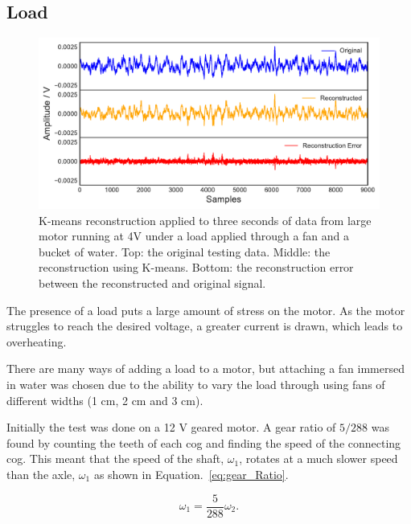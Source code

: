

\subsection{Load}

\begin{figure}[t]
    \includegraphics[width=1.0\textwidth]{fig/kmeans_large_4Vwater.pdf}
    \caption[K-means Large Motor Reconstruction In Water]{K-means reconstruction applied to three seconds of data from large motor running at 4V under a load applied through a fan and a bucket of water. Top: the original testing data. Middle: the reconstruction using K-means. Bottom: the reconstruction error between the reconstructed and original signal.}
    \label{fig:kmeans_large4Vwater}
\end{figure}

The presence of a load puts a large amount of stress on the motor. As the motor struggles to reach the desired voltage, a greater current is drawn, which leads to overheating.
        
There are many ways of adding a load to a motor, but attaching a fan immersed in water was chosen due to the ability to vary the load through using fans of different widths (1 cm, 2 cm and 3 cm).
    
Initially the test was done on a 12 V geared motor. A gear ratio of ${5}/{288}$ was found by counting the teeth of each cog and finding the speed of the connecting cog. This meant that the speed of the shaft, $\omega_1$, rotates at a much slower speed than the axle, $\omega _1$ as shown in Equation.~\eqref{eq:gear_Ratio}.

\begin{equation}
\omega_1 = \frac{5}{288} \omega_2.
\label{eq:gear_Ratio}
\end{equation}

